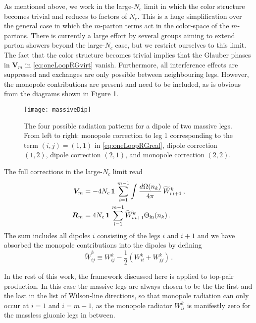 \documentclass[11pt,a4paper]{article}
\begin{document}
As mentioned above, we work in the large-$N_c$ limit in which the color structure becomes trivial and reduces to factors of $N_c$. This is a huge simplification over the general case in which the $m$-parton terms act in the color-space of the $m$-partons. There is currently a large effort by several groups aiming to extend parton showers beyond the large-$N_c$ case, but we restrict ourselves to this limit. The fact that the color structure becomes trivial implies that the Glauber phases in  $\bm{V}_m$ in \eqref{eq:oneLoopRGvirt} vanish. Furthermore, all interference effects are suppressed and exchanges are only possible between neighbouring legs. However, the monopole contributions are present and need to be included, as is obvious from the diagrams shown in Figure \ref{fig:corrDiag}.


\begin{figure}[t]
	\centering
	\texttt{[image: massiveDip]}
	\caption{The four possible radiation patterns for a dipole of two massive legs. From left to right: monopole correction to leg 1 corresponding to the term $(i,j) =(1,1)$ in \eqref{eq:oneLoopRGreal}, dipole correction $(1,2)$, dipole correction $(2,1)$, and monopole correction $(2,2)$.   \label{fig:corrDiag}}
\end{figure}

The full corrections in the large-$N_c$ limit read
\begin{align}
\bm{V}_m  &= - 4 N_c \,\bm{1}\,\sum_{i=1}^{m-1} \int \frac{d\Omega(n_k)}{4\pi}\, \widetilde{W}_{i\,i+1}^k  \,, \label{eq:oneLoopRGlargeNcvirt} \\
\bm{R}_m & = 4 N_c \,\bm{1}\,\sum_{i=1}^{m-1}   \widetilde{W}_{i\,i+1}^k \Theta_{\rm in}(n_{k}) \label{eq:oneLoopRGlargeNcreal}\,.
\end{align}
The sum includes all dipoles $i$ consisting of the legs $i$ and $i+1$ and we have absorbed the monopole contributions into the dipoles by defining
\begin{equation}\label{eq:tildeWijk}
\widetilde{W}_{ij}^k \equiv W_{ij}^k -\frac{1}{2}\left(W_{ii}^k+W_{jj}^k\right)\,.
\end{equation}

In the rest of this work, the framework discussed here is applied to top-pair production. In this case the massive legs are always chosen to be the the first and the last in the list of Wilson-line directions, so that monopole radiation can only occur at $i=1$ and $i=m-1$, as the monopole radiator $W_{ii}^k$ is manifestly zero for the massless gluonic legs in between.
\end{document}
